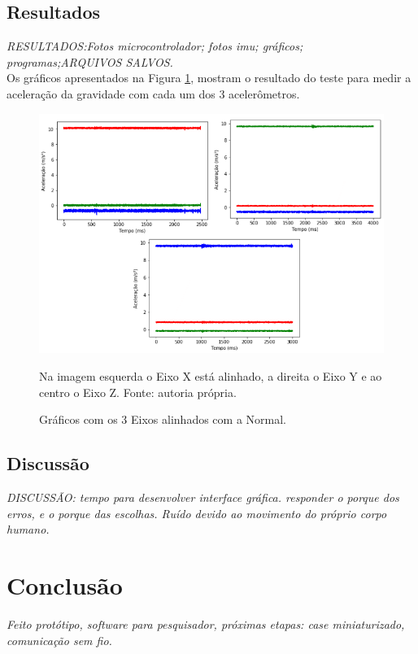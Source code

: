 	\section{Resultados}
	\textit{RESULTADOS:Fotos microcontrolador; fotos imu; gráficos; programas;ARQUIVOS SALVOS.}\\
	
	Os gráficos apresentados na Figura \ref{acelx_0}, mostram o resultado do teste para medir a aceleração da gravidade com cada um dos 3 acelerômetros.
	
	\begin{figure}[h]
		\centering
		\includegraphics[keepaspectratio=true,scale=0.6]{figuras/graficos_acel.png}
		\caption{Gráficos com os 3 Eixos alinhados com a Normal.}
		Na imagem esquerda o Eixo X está alinhado, a direita o Eixo Y e ao centro o Eixo Z. \footnotesize
		Fonte: autoria própria. 
		\label{acelx_0}	
	\end{figure}		
	\section{Discussão}		
	\textit{DISCUSSÃO: tempo para desenvolver interface gráfica. responder o porque dos erros, e o porque das escolhas. Ruído devido ao movimento do próprio corpo humano. 	
	}
\chapter{Conclusão}
	
	\textit{Feito protótipo, software para pesquisador, próximas etapas: case miniaturizado, comunicação sem fio.}